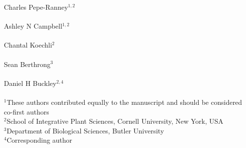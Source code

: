 Charles Pepe-Ranney$^{1,2}$\\
\\
Ashley N Campbell$^{1,2}$\\
\\
Chantal Koechli$^{2}$\\
\\
Sean Berthrong$^{3}$\\
\\
Daniel H Buckley$^{2,4}$\\
\\
$^{1}$These authors contributed equally to the manuscript and should be considered co-first authors\\
$^{2}$School of Integrative Plant Sciences, Cornell University, New York, USA\\
$^{3}$Department of Biological Sciences, Butler University\\
$^{4}$Corresponding author\\
